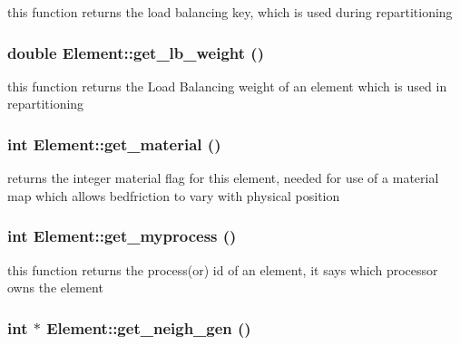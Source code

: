 this function returns the load balancing key, which is used during repartitioning 

\hypertarget{classElement_a54}{
\subsubsection[get\_\-lb\_\-weight]{\setlength{\rightskip}{0pt plus 5cm}double Element::get\_\-lb\_\-weight ()}}
\label{classElement_a54}


this function returns the Load Balancing weight of an element which is used in repartitioning 

\hypertarget{classElement_a8}{
\subsubsection[get\_\-material]{\setlength{\rightskip}{0pt plus 5cm}int Element::get\_\-material ()}}
\label{classElement_a8}


returns the integer material flag for this element, needed for use of a material map which allows bedfriction to vary with physical position 

\hypertarget{classElement_a60}{
\subsubsection[get\_\-myprocess]{\setlength{\rightskip}{0pt plus 5cm}int Element::get\_\-myprocess ()}}
\label{classElement_a60}


this function returns the process(or) id of an element, it says which processor owns the element 

\hypertarget{classElement_a42}{
\subsubsection[get\_\-neigh\_\-gen]{\setlength{\rightskip}{0pt plus 5cm}int $\ast$ Element::get\_\-neigh\_\-gen ()}}
\label{classElement_a42}


